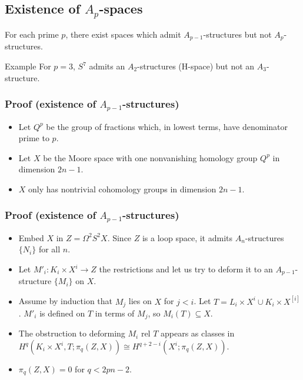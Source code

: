 \documentclass{beamer}
\theoremstyle{definition}
\newcommand{\Z}{\mathbb{Z}}
\begin{document}
\subsection{Existence of $A_p$-spaces}
\begin{frame}[fragile]
\begin{theorem}
For each prime $p$, there exist spaces which admit $A_{p-1}$-structures but not $A_p$-structures.
\end{theorem}\pause
\begin{block}{Example}
For $p=3$, $S^7$ admits an $A_2$-structures (H-space) but not an $A_3$-structure.
\end{block}
\end{frame}
\begin{frame}
\frametitle{Proof (existence of $A_{p-1}$-structures)}
\begin{itemize}
\item<1-> Let $Q^p$ be the group of fractions which, in lowest terms, have denominator prime to $p$.
\item<2-> Let $X$ be the Moore space with one nonvanishing homology group $Q^p$ in dimension $2n-1$. %
\item<3-> $X$ only has nontrivial cohomology groups in dimension $2n-1$.
\end{itemize}
\end{frame}
\begin{frame}
\frametitle{Proof (existence of $A_{p-1}$-structures)}
\begin{itemize}
\item<1-> Embed $X$ in $Z=\Omega^2S^2X$. Since $Z$ is a loop space, it admits $A_n$-structures $\{N_i\}$ for all $n$.
\item<2-> Let $M'_i:K_i\times X^i\to Z$ the restrictions and let us try to deform it to an $A_{p-1}$-structure $\{M_i\}$ on $X$.
\item<3-> Assume by induction that $M_j$ lies on $X$ for $j<i$. Let $T=L_i\times X^i\cup K_i\times X^{[i]}$. $M'_i$ is defined on $T$ in terms of $M_j$, so $M_i(T)\subseteq X$. %
\item<4-> The obstruction to deforming $M_i$ rel $T$ appears as classes in $H^q(K_i\times X^i,T;\pi_q(Z,X))\cong H^{q+2-i}(X^i;\pi_q(Z,X))$.
\item<5-> $\pi_q(Z,X)=0$ for $q<2pn-2$.

\end{itemize}
\end{frame}
\end{document}
